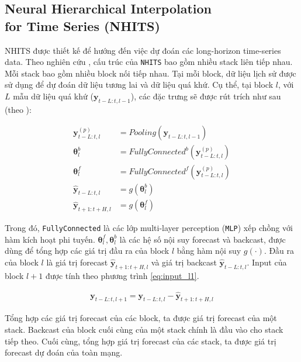 \documentclass[aps,prb,groupedaddress,twocolumn,showpacs,dvipdfmx, superscriptaddress,pdftex]{revtex4-2}
\begin{document}
\subsection{Neural Hierarchical Interpolation\\for Time Series (NHITS)}

NHITS được thiết kế để hướng đến việc dự đoán các long-horizon time-series data. Theo nghiên cứu \cite{challu2023nhits}, cấu trúc của \verb|NHITS| bao gồm nhiều stack liên tiếp nhau. Mỗi stack bao gồm nhiều block nối tiếp nhau. Tại mỗi block, dữ liệu lịch sử được sử dụng để dự đoán dữ liệu tương lai và dữ liệu quá khứ. Cụ thể, tại block $l$, với $L$ mẫu dữ liệu quá khứ ($\mathbf{y}_{t-L:t, l-1}$), các đặc trưng sẽ được rút trích như sau (theo \cite{challu2023nhits}):

\begin{align}
  \mathbf{y}_{t-L:t, l}^{(p)} &= Pooling\left( \mathbf{y}_{t-L:t, l-1} \right)\\
  \mathbf{\theta}_l^b &= FullyConnected^b \left( \mathbf{y}_{t-L:t, l}^{(p)} \right)\\
  \mathbf{\theta}_l^f &= FullyConnected^f \left( \mathbf{y}_{t-L:t, l}^{(p)} \right)\\
  \mathbf{\hat{y}}_{t-L:t, l} &= g(\mathbf{\theta}_l^b)\\
  \mathbf{\hat{y}}_{t+1:t+H, l} &= g(\mathbf{\theta}_l^f)
\end{align}

Trong đó, \verb|FullyConnected| là các lớp multi-layer perception (\verb|MLP|) xếp chồng với hàm kích hoạt phi tuyến. $\mathbf{\theta}_l^f, \mathbf{\theta}_l^b$ là các hệ số nội suy forecast và backcast, được dùng để tổng hợp các giá trị đầu ra của block $l$ bằng hàm nội suy $g(\cdot)$. Đầu ra của block $l$ là giá trị forecast $\mathbf{\hat{y}}_{t+1:t+H, l}$ và giá trị backcast $\mathbf{\hat{y}}_{t-L:t, l}$. Input của block $l+1$ được tính theo phương trình \ref{eq:input_l1}.

\begin{align}
  \mathbf{y}_{t-L:t, l+1} = \mathbf{y}_{t-L:t, l} - \mathbf{\hat{y}}_{t+1:t+H, l}
  \label{eq:input_l1}
\end{align}

Tổng hợp các giá trị forecast của các block, ta được giá trị forecast của một stack. Backcast của block cuối cùng của một stack chính là đầu vào cho stack tiếp theo. Cuối cùng, tổng hợp giá trị forecast của các stack, ta được giá trị forecast dự đoán của toàn mạng.
\end{document}
